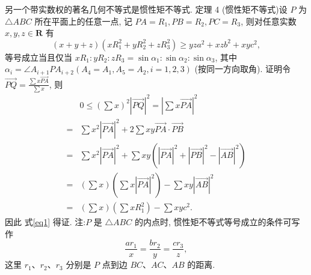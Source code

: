 另一个带实数权的著名几何不等式是惯性矩不等式.
定理 4 (惯性矩不等式)设 $P$ 为 $\triangle A B C$ 所在平面上的任意一点, 记 $P A=R_1, P B=R_2, P C=R_3$, 则对任意实数 $x, y, z \in \mathbf{R}$ 有
$$
(x+y+z)\left(x R_1^2+y R_2^2+z R_3^2\right) \geqslant y z a^2+x z b^2+x y c^2, \label{eq1}
$$
等号成立当且仅当 $x R_1: y R_2: z R_3=\sin \alpha_1: \sin \alpha_2: \sin \alpha_3$, 其中 $\alpha_i= \angle A_{i+1} P A_{i+2}\left(A_4=A_1, A_5=A_2, i=1,2,3\right)$ (按同一方向取角).
证明令 $\overrightarrow{P Q}=\frac{\sum x \overrightarrow{P A}}{\sum x}$, 则
$$
\begin{aligned}
& 0 \leqslant\left(\sum x\right)^2|\overrightarrow{P Q}|^2=\left|\sum x \overrightarrow{P A}\right|^2 \\
= & \sum x^2|\overrightarrow{P A}|^2+2 \sum x y \overrightarrow{P A} \cdot \overrightarrow{P B} \\
= & \sum x^2|\overrightarrow{P A}|^2+\sum x y\left(|\overrightarrow{P A}|^2+|\overrightarrow{P B}|^2-|\overrightarrow{A B}|^2\right) \\
= & \left(\sum x\right)\left(\sum x|\overrightarrow{P A}|^2\right)-\sum x y|\overrightarrow{A B}|^2 \\
= & \left(\sum x\right)\left(\sum x R_1^2\right)-\sum x y c^2 .
\end{aligned}
$$
因此 式\ref{eq1} 得证.
注:$P$ 是 $\triangle A B C$ 的内点时, 惯性矩不等式等号成立的条件可写作
$$
\frac{a r_1}{x}=\frac{b r_2}{y}=\frac{c r_3}{z},
$$
这里 $r_1 、 r_2 、 r_3$ 分别是 $P$ 点到边 $B C 、 A C 、 A B$ 的距离.




